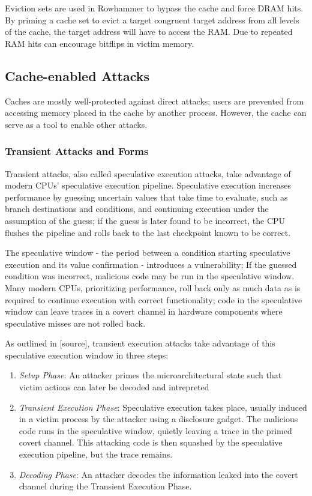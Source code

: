\documentclass[letterpaper, twocolumn]{article}
\begin{document}
Eviction sets are used in Rowhammer to bypass the cache and force DRAM hits.
By priming a cache set to evict a target congruent target address from all levels of the cache,
the target address will have to access the RAM.
Due to %
repeated RAM hits can encourage bitflips in victim memory.

\subsection{Cache-enabled Attacks}
Caches are mostly well-protected against direct attacks;
users are prevented from accessing memory placed in the cache by another process.
However, the cache can serve as a tool to enable other attacks.

\subsubsection{Transient Attacks and Forms}
Transient attacks, also called speculative execution attacks, take advantage of modern CPUs' speculative execution pipeline.
Speculative execution increases performance by guessing uncertain values that take time to evaluate, such as branch destinations
and conditions, and continuing execution under the assumption of the guess;
if the guess is later found to be incorrect, the CPU flushes the pipeline and rolls back to the last checkpoint known to be correct.

The speculative window - the period between a condition starting speculative execution and its value confirmation -
introduces a vulnerability;
If the guessed condition was incorrect, malicious code may be run in the speculative window.
Many modern CPUs, prioritizing performance, roll back only as much data as is required to continue execution
with correct functionality; code in the speculative window can leave traces in a covert channel in hardware
components where speculative misses are not rolled back.

As outlined in [source], transient execution attacks take advantage of this speculative execution window in three steps:
\begin{enumerate}
    \item \textit{Setup Phase}:
An attacker primes the microarchitectural state such that victim actions can later be decoded and intrepreted
    \item \textit{Transient Execution Phase}:
Speculative execution takes place, usually induced in a victim process by the attacker using a disclosure gadget.
The malicious code runs in the speculative window, quietly leaving a trace in the primed covert channel.
This attacking code is then squashed by the speculative execution pipeline, but the trace remains.
    \item \textit{Decoding Phase}:
An attacker decodes the information leaked into the covert channel during the Transient Execution Phase.
\end{enumerate}
\end{document}
